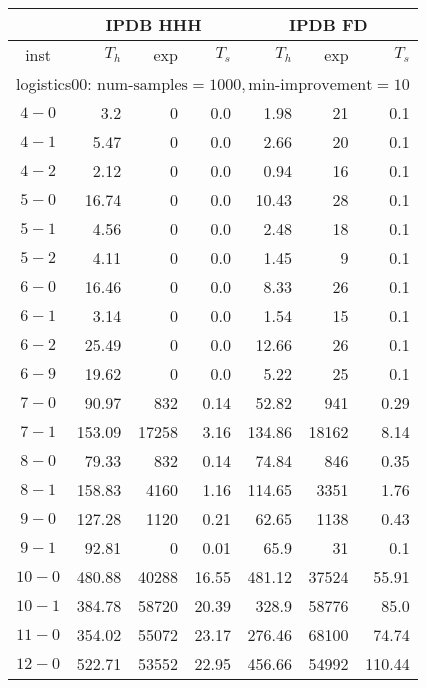 \begin{longtable}{|c||r|r|r||r|r|r|}\firsthline
& \multicolumn{3}{c||}{IPDB HHH} & \multicolumn{3}{c||}{IPDB FD}\\\hline
inst & $T_h$ & exp & $T_s$ & $T_h$ & exp & $T_s$\\\hline
\multicolumn{7}{|l|}{logistics00: $\text{num-samples}=1000,\text{min-improvement}=10$}\\\hline
$4-0$ & 3.2 & 0 & 0.0 & 1.98 & 21 & 0.1 \\\hline
$4-1$ & 5.47 & 0 & 0.0 & 2.66 & 20 & 0.1 \\\hline
$4-2$ & 2.12 & 0 & 0.0 & 0.94 & 16 & 0.1 \\\hline
$5-0$ & 16.74 & 0 & 0.0 & 10.43 & 28 & 0.1 \\\hline
$5-1$ & 4.56 & 0 & 0.0 & 2.48 & 18 & 0.1 \\\hline
$5-2$ & 4.11 & 0 & 0.0 & 1.45 & 9 & 0.1 \\\hline
$6-0$ & 16.46 & 0 & 0.0 & 8.33 & 26 & 0.1 \\\hline
$6-1$ & 3.14 & 0 & 0.0 & 1.54 & 15 & 0.1 \\\hline
$6-2$ & 25.49 & 0 & 0.0 & 12.66 & 26 & 0.1 \\\hline
$6-9$ & 19.62 & 0 & 0.0 & 5.22 & 25 & 0.1 \\\hline
$7-0$ & 90.97 & 832 & 0.14 & 52.82 & 941 & 0.29 \\\hline
$7-1$ & 153.09 & 17258 & 3.16 & 134.86 & 18162 & 8.14 \\\hline
$8-0$ & 79.33 & 832 & 0.14 & 74.84 & 846 & 0.35 \\\hline
$8-1$ & 158.83 & 4160 & 1.16 & 114.65 & 3351 & 1.76 \\\hline
$9-0$ & 127.28 & 1120 & 0.21 & 62.65 & 1138 & 0.43 \\\hline
$9-1$ & 92.81 & 0 & 0.01 & 65.9 & 31 & 0.1 \\\hline
$10-0$ & 480.88 & 40288 & 16.55 & 481.12 & 37524 & 55.91 \\\hline
$10-1$ & 384.78 & 58720 & 20.39 & 328.9 & 58776 & 85.0 \\\hline
$11-0$ & 354.02 & 55072 & 23.17 & 276.46 & 68100 & 74.74 \\\hline
$12-0$ & 522.71 & 53552 & 22.95 & 456.66 & 54992 & 110.44 \\\hline


\end{longtable}
